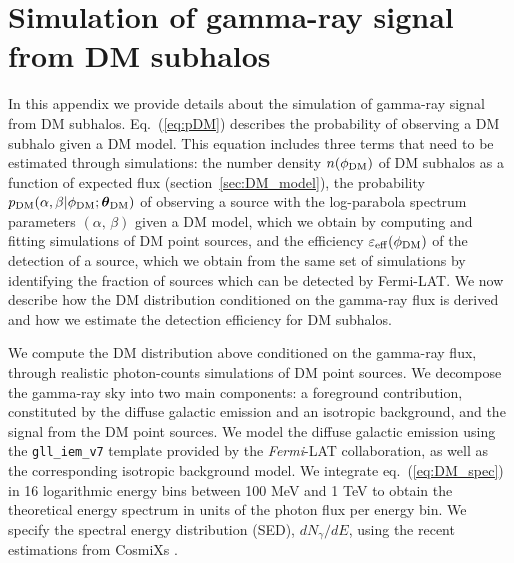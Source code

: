 \documentclass[12pt, a4paper]{article}
\newcommand{\Fermi}{{\textit{Fermi}}}
\newcommand{\btheta}{\boldsymbol{\theta}}
\begin{document}
\section{Simulation of gamma-ray signal from DM subhalos}
\label{sec:sim-ps}

In this appendix we provide details about the simulation of gamma-ray signal from DM subhalos.
Eq.~(\ref{eq:pDM}) describes the probability of observing a DM subhalo 
given a DM model.
This equation includes three terms that need to be estimated through simulations: 
the number density $n(\phi_{\rm DM})$ of DM subhalos as a function of expected flux
 (section~\ref{sec:DM_model}), the probability $p_{\rm DM}(\alpha,\beta|\phi_{\rm DM};\btheta_{\rm DM})$  of observing a source with the log-parabola spectrum parameters $(\alpha,\,\beta)$ given a DM model, which we obtain by computing and fitting simulations of DM point sources, and the efficiency $\varepsilon_{\rm eff}(\phi_{\rm DM})$ of the detection of a source, which we obtain from the same set of simulations by identifying the fraction of sources which can be detected by Fermi-LAT.  
We now describe how the DM distribution conditioned on the gamma-ray flux is derived and how we estimate the detection efficiency for DM subhalos.



We compute the DM distribution above conditioned on the gamma-ray flux, through realistic photon-counts simulations of DM point sources. 
We decompose the gamma-ray sky into two main components: a foreground contribution, constituted by the diffuse galactic emission and an isotropic background, and the signal from the DM point sources. 
We model the diffuse galactic emission using the \verb|gll_iem_v7| template provided by the \Fermi-LAT collaboration, as well as the corresponding isotropic background model. %
%
We integrate eq.~(\ref{eq:DM_spec}) in 16 logarithmic energy bins between 100 MeV and 1 TeV to obtain the theoretical energy spectrum in units of the photon flux per energy bin.
We specify the spectral energy distribution (SED), $dN_\gamma/dE$, using the recent estimations from CosmiXs \cite{2024JCAP...03..035A}.
\end{document}
